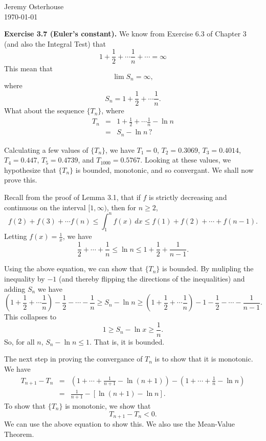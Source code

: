 \documentclass[12pt,letterpaper]{article}
\begin{document}
\begin{flushright}
\linespread{1}	%
\small \normalsize %
Jeremy Osterhouse \\
\today
\end{flushright}

{\bf Exercise 3.7 (Euler's constant).} We know from Exercise 6.3 of Chapter 3 (and also the Integral Test) that
\[
1+\frac{1}{2}+\cdots\frac{1}{n}+\cdots=\infty
\]
This mean that 
\[
\lim{S_n}=\infty,
\]
where
\[
S_n = 1 + \frac{1}{2}+\cdots \frac{1}{n}.
\]
What about the sequence $\{T_n\}$, where
\begin{eqnarray*}
T_n & = & 1 + \frac{1}{2}+\cdots\frac{1}{n}-\ln{n} \\
 & = & S_n - \ln{n}\,?
\end{eqnarray*}

Calculating a few values of $\{T_n\}$, we have $T_1=0$, $T_2=0.3069$, $T_3=0.4014$, $T_4=0.447$, $T_5=0.4739$, and $T_{1000}=0.5767$. Looking at these values, we hypothesize that $\{T_n\}$ is bounded, monotonic, and so convergant. We shall now prove this.

Recall from the proof of Lemma 3.1, that if $f$ is strictly decreasing and continuous on the interval $[1,\infty )$, then for $n\geq 2$,
\[
f(2)+f(3)+\cdots f(n) \leq \int_1^n f(x)\, dx \leq f(1) + f(2) + \cdots + f(n-1).
\]
Letting $f(x) = \frac{1}{x}$, we have 
\[
\frac{1}{2} + \cdots + \frac{1}{n} \leq \ln{n} \leq 1 + \frac{1}{2} + \frac{1}{n-1}.
\]

Using the above equation, we can show that $\{T_n\}$ is bounded. By mulipling the inequality by $-1$ (and thereby flipping the directions of the inequalities) and adding $S_n$ we have
\[
\left(1 + \frac{1}{2}+\cdots \frac{1}{n}\right) - \frac{1}{2} - \cdots - \frac{1}{n} 
\geq S_n - \ln{n} \geq 
\left(1 + \frac{1}{2}+\cdots \frac{1}{n}\right) - 1 - \frac{1}{2} - \cdots - \frac{1}{n-1}.
\]
This collapses to
\[
1 \geq S_n - \ln{x} \geq \frac{1}{n}.
\]
So, for all $n$, $S_n - \ln{n} \leq 1$. That is, it is bounded.

The next step in proving the convergance of $T_n$ is to show that it is monotonic. We have
\begin{eqnarray*}
T_{n+1}-T_n & = & (1 + \cdots + \frac{1}{n+1} - \ln{(n+1)}) - (1+ \cdots + \frac{1}{n}-\ln{n}) \\
& = & \frac{1}{n+1} - [\ln{(n+1)}-\ln{n}].
\end{eqnarray*}
To show that $\{T_n\}$ is monotonic, we show that
\[
T_{n+1}-T_n < 0.
\]
We can use the above equation to show this. We also use the Mean-Value Theorem.
\end{document}
